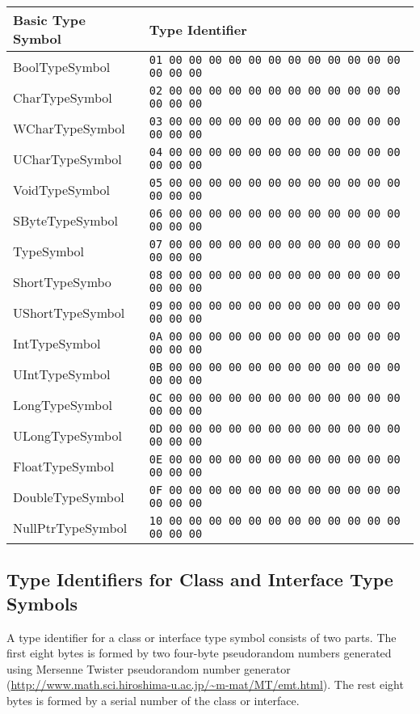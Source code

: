 \documentclass[a4paper,oneside,11pt]{book}
\theoremstyle{definition}
\begin{document}
\begin{flushleft}
\begin{supertabular}{ll}
\textbf{Basic Type Symbol}& \textbf{Type Identifier}\\
\hline
BoolTypeSymbol& \verb|01 00 00 00 00 00 00 00 00 00 00 00 00 00 00 00|\\
CharTypeSymbol& \verb|02 00 00 00 00 00 00 00 00 00 00 00 00 00 00 00|\\
WCharTypeSymbol& \verb|03 00 00 00 00 00 00 00 00 00 00 00 00 00 00 00|\\
UCharTypeSymbol& \verb|04 00 00 00 00 00 00 00 00 00 00 00 00 00 00 00|\\
VoidTypeSymbol& \verb|05 00 00 00 00 00 00 00 00 00 00 00 00 00 00 00|\\
SByteTypeSymbol& \verb|06 00 00 00 00 00 00 00 00 00 00 00 00 00 00 00|\\
TypeSymbol& \verb|07 00 00 00 00 00 00 00 00 00 00 00 00 00 00 00|\\
ShortTypeSymbo& \verb|08 00 00 00 00 00 00 00 00 00 00 00 00 00 00 00|\\
UShortTypeSymbol& \verb|09 00 00 00 00 00 00 00 00 00 00 00 00 00 00 00|\\
IntTypeSymbol& \verb|0A 00 00 00 00 00 00 00 00 00 00 00 00 00 00 00|\\
UIntTypeSymbol& \verb|0B 00 00 00 00 00 00 00 00 00 00 00 00 00 00 00|\\
LongTypeSymbol& \verb|0C 00 00 00 00 00 00 00 00 00 00 00 00 00 00 00|\\
ULongTypeSymbol& \verb|0D 00 00 00 00 00 00 00 00 00 00 00 00 00 00 00|\\
FloatTypeSymbol& \verb|0E 00 00 00 00 00 00 00 00 00 00 00 00 00 00 00|\\
DoubleTypeSymbol& \verb|0F 00 00 00 00 00 00 00 00 00 00 00 00 00 00 00|\\
NullPtrTypeSymbol& \verb|10 00 00 00 00 00 00 00 00 00 00 00 00 00 00 00|\\
\hline
\end{supertabular}
\end{flushleft}

\clearpage
\subsection{Type Identifiers for Class and Interface Type Symbols}

A type identifier for a class or interface type symbol consists of two parts.
The first eight bytes is formed by two four-byte pseudorandom numbers generated using Mersenne Twister pseudorandom number generator
(\url{http://www.math.sci.hiroshima-u.ac.jp/~m-mat/MT/emt.html}).
The rest eight bytes is formed by a serial number of the class or interface.
\end{document}
